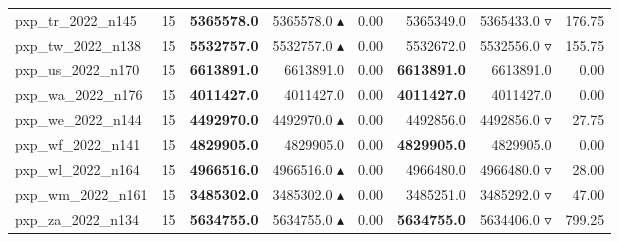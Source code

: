 \begin{table}[]
{\begin{tabular}{ll@{\hspace{1.2cm}}rrr@{\hspace{1.2cm}}rrr}
pxp_tr_2022_n145 & 15 & \textbf{5365578.0} & 5365578.0 $\blacktriangle$ & 0.00 & 5365349.0 & 5365433.0 $\triangledown$ & 176.75 \\
pxp_tw_2022_n138 & 15 & \textbf{5532757.0} & 5532757.0 $\blacktriangle$ & 0.00 & 5532672.0 & 5532556.0 $\triangledown$ & 155.75 \\
pxp_us_2022_n170 & 15 & \textbf{6613891.0} & 6613891.0 \phantom{$\blacktriangle$} & 0.00 & \textbf{6613891.0} & 6613891.0 \phantom{$\blacktriangle$} & 0.00 \\
pxp_wa_2022_n176 & 15 & \textbf{4011427.0} & 4011427.0 \phantom{$\blacktriangle$} & 0.00 & \textbf{4011427.0} & 4011427.0 \phantom{$\blacktriangle$} & 0.00 \\
pxp_we_2022_n144 & 15 & \textbf{4492970.0} & 4492970.0 $\blacktriangle$ & 0.00 & 4492856.0 & 4492856.0 $\triangledown$ & 27.75 \\
pxp_wf_2022_n141 & 15 & \textbf{4829905.0} & 4829905.0 \phantom{$\blacktriangle$} & 0.00 & \textbf{4829905.0} & 4829905.0 \phantom{$\blacktriangle$} & 0.00 \\
pxp_wl_2022_n164 & 15 & \textbf{4966516.0} & 4966516.0 $\blacktriangle$ & 0.00 & 4966480.0 & 4966480.0 $\triangledown$ & 28.00 \\
pxp_wm_2022_n161 & 15 & \textbf{3485302.0} & 3485302.0 $\blacktriangle$ & 0.00 & 3485251.0 & 3485292.0 $\triangledown$ & 47.00 \\
pxp_za_2022_n134 & 15 & \textbf{5634755.0} & 5634755.0 $\blacktriangle$ & 0.00 & \textbf{5634755.0} & 5634406.0 $\triangledown$ & 799.25 \\
\bottomrule
    \end{tabular}
    }
\end{table}
